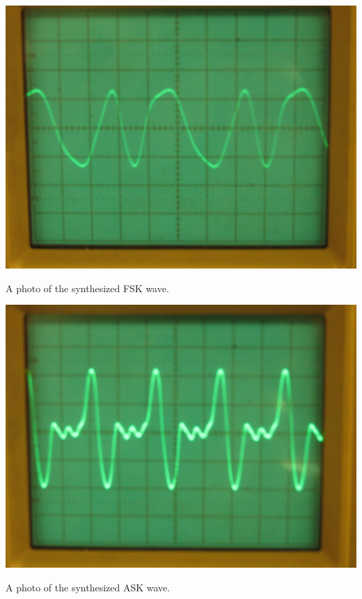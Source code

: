 \begin{enumerate}[resume]
\begin{marginfigure}
\includegraphics[scale=.85]{FS-FSK-sketch.jpg}
\caption{A photo of the synthesized FSK wave.}
\label{fig:fscg14}
\end{marginfigure}



\begin{marginfigure}
\includegraphics[scale=.85]{FS-ASK-sketch.jpg}
\caption{A photo of the synthesized ASK wave.}
\label{fig:fscg15}
\end{marginfigure}



\end{enumerate}
